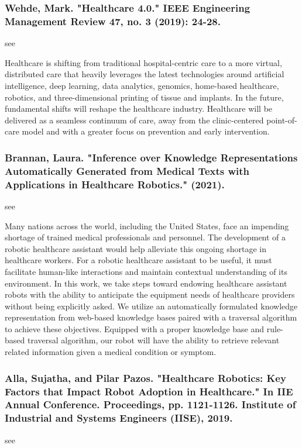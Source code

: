 \documentclass[conference]{IEEEtran}
\begin{document}
\medskip
\subsubsection{Wehde, Mark. "Healthcare 4.0." IEEE Engineering Management Review 47, no. 3 (2019): 24-28.}
see \cite{wehde2019healthcare}

Healthcare is shifting from traditional hospital-centric care to a more virtual, distributed care that heavily leverages the latest technologies around artificial intelligence, deep learning, data analytics, genomics, home-based healthcare, robotics, and three-dimensional printing of tissue and implants. In the future, fundamental shifts will reshape the healthcare industry. Healthcare will be delivered as a seamless continuum of care, away from the clinic-centered point-of-care model and with a greater focus on prevention and early intervention.

\medskip
\subsubsection{Brannan, Laura. "Inference over Knowledge Representations Automatically Generated from Medical Texts with Applications in Healthcare Robotics." (2021).}
see \cite{brannan2021inference}

Many nations across the world, including the United States, face an impending shortage of trained medical professionals and personnel. The development of a robotic healthcare assistant would help alleviate this ongoing shortage in healthcare workers. For a robotic healthcare assistant to be useful, it must facilitate human-like interactions and maintain contextual understanding of its environment. In this work, we take steps toward endowing healthcare assistant robots with the ability to anticipate the equipment needs of healthcare providers without being explicitly asked. We utilize an automatically formulated knowledge representation from web-based knowledge bases paired with a traversal algorithm to achieve these objectives. Equipped with a proper knowledge base and rule-based traversal algorithm, our robot will have the ability to retrieve relevant related information given a medical condition or symptom.

\medskip
\subsubsection{Alla, Sujatha, and Pilar Pazos. "Healthcare Robotics: Key Factors that Impact Robot Adoption in Healthcare." In IIE Annual Conference. Proceedings, pp. 1121-1126. Institute of Industrial and Systems Engineers (IISE), 2019.}
see \cite{alla2019healthcare}
\end{document}
